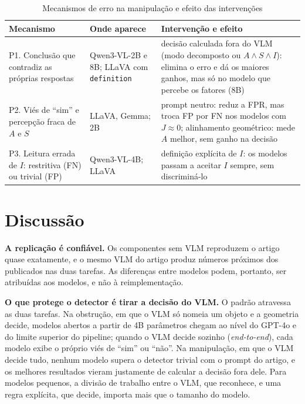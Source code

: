\documentclass[journal,onecolumn]{IEEEtran}
\begin{document}
\begin{table}[!t]
\renewcommand{\arraystretch}{1.2}
\caption{Mecanismos de erro na manipulação e efeito das intervenções}
\label{tab:problemas}
\centering
\footnotesize
\begin{tabular}{L{4.4cm}L{3.0cm}L{8.4cm}}
\toprule
Mecanismo & Onde aparece & Intervenção e efeito \\
\midrule
P1. Conclusão que contradiz as próprias respostas & Qwen3-VL-2B e 8B; LLaVA com \texttt{definition} & decisão calculada fora do VLM (modo decomposto ou $A\wedge S\wedge I$): elimina o erro e dá os maiores ganhos, mas só no modelo que percebe os fatores (8B) \\
P2. Viés de ``sim'' e percepção fraca de $A$ e $S$ & LLaVA, Gemma; 2B & prompt neutro: reduz a FPR, mas troca FP por FN nos modelos com $J\approx 0$; alinhamento geométrico: mede $A$ melhor, sem ganho na decisão \\
P3. Leitura errada de $I$: restritiva (FN) ou trivial (FP) & Qwen3-VL-4B; LLaVA & definição explícita de $I$: os modelos passam a aceitar $I$ sempre, sem discriminá-lo \\
\bottomrule
\end{tabular}
\end{table}

\section{Discussão}
\label{sec:disc}

\textbf{A replicação é confiável.} Os componentes sem VLM reproduzem o artigo quase exatamente, e o
mesmo VLM do artigo produz números próximos dos publicados nas duas tarefas. As diferenças entre
modelos podem, portanto, ser atribuídas aos modelos, e não à reimplementação.

\textbf{O que protege o detector é tirar a decisão do VLM.} O padrão atravessa as duas tarefas. Na
obstrução, em que o VLM só nomeia um objeto e a geometria decide, modelos abertos a partir de 4B
parâmetros chegam ao nível do GPT-4o e do limite superior do pipeline; quando o VLM decide sozinho
(\emph{end-to-end}), cada modelo exibe o próprio viés de ``sim'' ou ``não''. Na manipulação, em que o
VLM decide tudo, nenhum modelo supera o detector trivial com o prompt do artigo, e os melhores
resultados vieram justamente de calcular a decisão fora dele. Para modelos pequenos, a divisão de
trabalho entre o VLM, que reconhece, e uma regra explícita, que decide, importa mais que o tamanho do
modelo.
\end{document}
